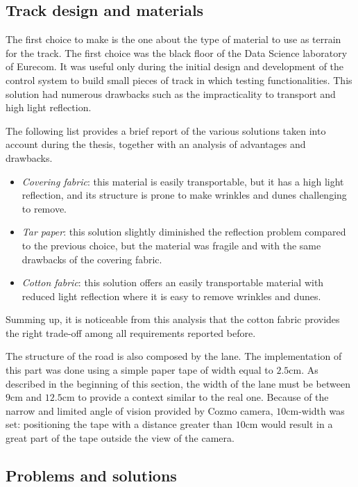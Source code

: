\subsection{Track design and materials}

The first choice to make is the one about the type of material to use as terrain for the track. The first choice was the black floor of the Data Science laboratory of Eurecom. It was useful only during the initial design and development of the control system to build small pieces of track in which testing functionalities. This solution had numerous drawbacks such as the impracticality to transport and high light reflection. 

The following list provides a brief report of the various solutions taken into account during the thesis, together with an analysis of advantages and drawbacks.

\begin{itemize}
	\item \textit{Covering fabric}: this material is easily transportable, but it has a high light reflection, and its structure is prone to make wrinkles and dunes challenging to remove.
	\item \textit{Tar paper}: this solution slightly diminished the reflection problem compared to the previous choice, but the material was fragile and with the same drawbacks of the covering fabric.
	\item \textit{Cotton fabric}: this solution offers an easily  transportable material with reduced light reflection where it is easy to remove wrinkles and dunes.
\end{itemize}

Summing up, it is noticeable from this analysis that the cotton fabric provides the right trade-off among all requirements reported before.

The structure of the road is also composed by the lane. The implementation of this part was done using a simple paper tape of width equal to $2.5$cm. As described in the beginning of this section, the width of the lane must be between $9$cm and $12.5$cm to provide a context similar to the real one. Because of the narrow and limited angle of vision provided by Cozmo camera, $10$cm-width was set: positioning the tape with a distance greater than $10$cm would result in a great part of the tape outside the view of the camera.



\subsection{Problems and solutions}



